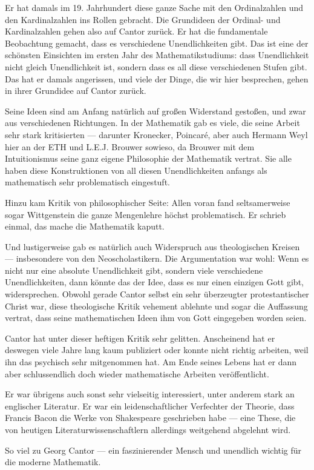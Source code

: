 \begin{spoken-clean}[00:13:30 - 00:15:23]
Er hat damals im 19. Jahrhundert diese ganze Sache mit den Ordinalzahlen und den Kardinalzahlen ins Rollen gebracht. Die Grundideen der Ordinal- und Kardinalzahlen gehen also auf Cantor zurück. Er hat die fundamentale Beobachtung gemacht, dass es verschiedene Unendlichkeiten gibt. Das ist eine der schönsten Einsichten im ersten Jahr des Mathematikstudiums: dass Unendlichkeit nicht gleich Unendlichkeit ist, sondern dass es all diese verschiedenen Stufen gibt. Das hat er damals angerissen, und viele der Dinge, die wir hier besprechen, gehen in ihrer Grundidee auf Cantor zurück.

Seine Ideen sind am Anfang natürlich auf großen Widerstand gestoßen, und zwar aus verschiedenen Richtungen. In der Mathematik gab es viele, die seine Arbeit sehr stark kritisierten --- darunter Kronecker, Poincaré, aber auch Hermann Weyl hier an der ETH und L.E.J. Brouwer sowieso, da Brouwer mit dem Intuitionismus seine ganz eigene Philosophie der Mathematik vertrat. Sie alle haben diese Konstruktionen von all diesen Unendlichkeiten anfangs als mathematisch sehr problematisch eingestuft.

Hinzu kam Kritik von philosophischer Seite: Allen voran fand seltsamerweise sogar Wittgenstein die ganze Mengenlehre höchst problematisch. Er schrieb einmal, das mache die Mathematik kaputt.

Und lustigerweise gab es natürlich auch Widerspruch aus theologischen Kreisen --- insbesondere von den Neoscholastikern. Die Argumentation war wohl: Wenn es nicht nur eine absolute Unendlichkeit gibt, sondern viele verschiedene Unendlichkeiten, dann könnte das der Idee, dass es nur einen einzigen Gott gibt, widersprechen. Obwohl gerade Cantor selbst ein sehr überzeugter protestantischer Christ war, diese theologische Kritik vehement ablehnte und sogar die Auffassung vertrat, dass seine mathematischen Ideen ihm von Gott eingegeben worden seien.

Cantor hat unter dieser heftigen Kritik sehr gelitten. Anscheinend hat er deswegen viele Jahre lang kaum publiziert oder konnte nicht richtig arbeiten, weil ihn das psychisch sehr mitgenommen hat. Am Ende seines Lebens hat er dann aber schlussendlich doch wieder mathematische Arbeiten veröffentlicht.

Er war übrigens auch sonst sehr vielseitig interessiert, unter anderem stark an englischer Literatur. Er war ein leidenschaftlicher Verfechter der Theorie, dass Francis Bacon die Werke von Shakespeare geschrieben habe --- eine These, die von heutigen Literaturwissenschaftlern allerdings weitgehend abgelehnt wird.

So viel zu Georg Cantor --- ein faszinierender Mensch und unendlich wichtig für die moderne Mathematik.
\end{spoken-clean}

